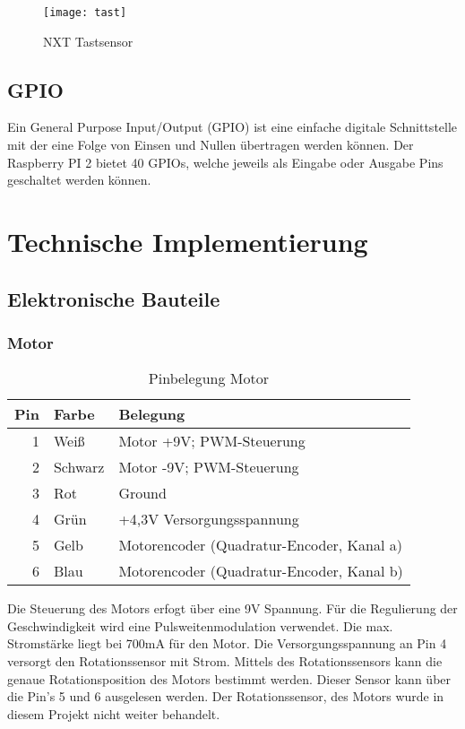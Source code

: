 \begin{figure}[h]
  \centering
  \texttt{[image: tast]}
  \caption{NXT Tastsensor}
  \label{Kap1:tast}
\end{figure}

\section{GPIO}
Ein General Purpose Input/Output (GPIO) ist eine einfache digitale Schnittstelle mit der eine Folge von Einsen und Nullen übertragen werden können.
Der Raspberry PI 2 bietet 40 GPIOs, welche jeweils als Eingabe oder Ausgabe Pins geschaltet werden können.

\chapter{Technische Implementierung}

\section{Elektronische Bauteile}

\subsection{Motor}\label{eb:motor}

\begin{table}[!ht]
\centering
\rmfamily
\caption{Pinbelegung Motor}
\renewcommand{\arraystretch}{1.1}
\sffamily
\begin{footnotesize}
\begin{tabular}{r | l l}
\toprule
\textbf{Pin} & \textbf{Farbe}  & \textbf{Belegung}\\
\midrule
1 & Weiß & Motor +9V; PWM-Steuerung \\
2 & Schwarz & Motor -9V; PWM-Steuerung \\
3 & Rot & Ground \\
4 & Grün & +4,3V Versorgungsspannung \\
5 & Gelb & Motorencoder (Quadratur-Encoder, Kanal a) \\
6 & Blau & Motorencoder (Quadratur-Encoder, Kanal b) \\
\bottomrule
\end{tabular}
\end{footnotesize}
\label{eb:motor:tbl}
\end{table}

Die Steuerung des Motors erfogt über eine 9V Spannung. Für die Regulierung der Geschwindigkeit wird eine Pulsweitenmodulation verwendet. Die max. Stromstärke liegt bei 700mA für den Motor.  Die Versorgungsspannung an Pin 4 versorgt den Rotationssensor mit Strom. Mittels des Rotationssensors kann die genaue Rotationsposition des Motors bestimmt werden. Dieser Sensor kann über die Pin's 5 und 6 ausgelesen werden. Der Rotationssensor, des Motors wurde in diesem Projekt nicht weiter behandelt.


